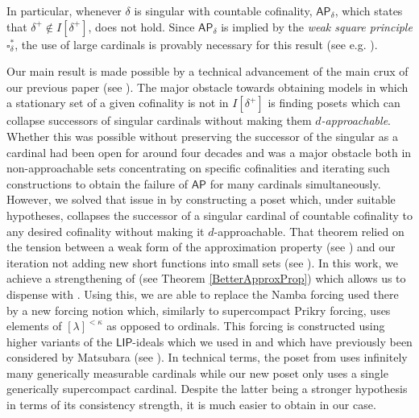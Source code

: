 \documentclass[a4paper]{amsart}
\theoremstyle{definition}
\theoremstyle{remark}
\theoremstyle{plain}
\numberwithin{mydef}{section}
\newcommand{\AP}{\mathsf{AP}}
\newcommand{\LIP}{\mathsf{LIP}}
\begin{document}
	In particular, whenever $\delta$ is singular with countable cofinality, $\AP_{\delta}$, which states that $\delta^+\notin I[\delta^+]$, does not hold. Since $\AP_{\delta}$ is implied by the \emph{weak square principle} $\square_{\delta}^*$, the use of large cardinals is provably necessary for this result (see e.g. \cite{SargsyanSquareFailure}).
	
	Our main result is made possible by a technical advancement of the main crux of our previous paper (see \cite[Theorem 4.11]{JakobLevineFailureApproachability}). The major obstacle towards obtaining models in which a stationary set of a given cofinality is not in $I[\delta^+]$ is finding posets which can collapse successors of singular cardinals without making them \emph{$d$-approachable}. Whether this was possible without preserving the successor of the singular as a cardinal had been open for around four decades and was a major obstacle both in non-approachable sets concentrating on specific cofinalities and iterating such constructions to obtain the failure of $\AP$ for many cardinals simultaneously. However, we solved that issue in \cite{JakobLevineFailureApproachability} by constructing a poset which, under suitable hypotheses, collapses the successor of a singular cardinal of countable cofinality to any desired cofinality without making it $d$-approachable. That theorem relied on the tension between a weak form of the approximation property (see \cite[Theorem 4.3.]{JakobLevineFailureApproachability}) and our iteration not adding new short functions into small sets (see \cite[Lemma 4.10]{JakobLevineFailureApproachability}). In this work, we achieve a strengthening of \cite[Theorem 4.3]{JakobLevineFailureApproachability} (see Theorem \ref{BetterApproxProp}) which allows us to dispense with \cite[Lemma 4.10]{JakobLevineFailureApproachability}. Using this, we are able to replace the Namba forcing used there by a new forcing notion which, similarly to supercompact Prikry forcing, uses elements of $[\lambda]^{<\kappa}$ as opposed to ordinals. This forcing is constructed using higher variants of the $\LIP$-ideals which we used in \cite{JakobLevineFailureApproachability} and which have previously been considered by Matsubara (see \cite{MatsubaraLIP}). In technical terms, the poset from \cite{JakobLevineFailureApproachability} uses infinitely many generically measurable cardinals while our new poset only uses a single generically supercompact cardinal. Despite the latter being a stronger hypothesis in terms of its consistency strength, it is much easier to obtain in our case.
	
\end{document}
